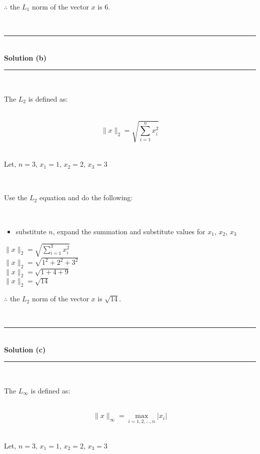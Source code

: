 \documentclass{article}
\begin{document}
\parbox{\textwidth}{$\therefore$ the $L_1$ norm of the vector $x$ is $6$.}\\

\noindent\rule{\textwidth}{0.4pt}\\

\textbf{Solution (b)}

\noindent\rule{\textwidth}{0.4pt}\\

\parbox{\textwidth}{The $L_2$ is defined as:}\\

$$\|x\|_2 = \sqrt{\sum_{i=1}^{n} x_i^2}$$\\

\parbox{\textwidth}{Let, $n=3$, $x_1 = 1$, $x_2 = 2$, $x_3 = 3$}\\

\parbox{\textwidth}{Use the $L_2$ equation and do the following:}\\

\begin{itemize}
    \item {substitute $n$, expand the summation and substitute values for $x_1$, $x_2$, $x_3$}
\end{itemize}

$\|x\|_2 = \sqrt{\sum_{i=1}^{3} x_i^2}$\\

$\|x\|_2 = \sqrt{1^2 + 2^2 + 3^2}$\\

$\|x\|_2 = \sqrt{1 + 4 + 9}$\\

$\|x\|_2 = \sqrt{14}$\\

\parbox{\textwidth}{$\therefore$ the $L_2$ norm of the vector $x$ is $\sqrt{14}$.}\\

\noindent\rule{\textwidth}{0.4pt}\\

\textbf{Solution (c)}

\noindent\rule{\textwidth}{0.4pt}\\

\parbox{\textwidth}{The $L_{\infty}$ is defined as:}\\

$$\|x\|_{\infty} = \max_{i=1,2,...,n} |x_i|$$\\

\parbox{\textwidth}{Let, $n=3$, $x_1 = 1$, $x_2 = 2$, $x_3 = 3$}\\
\end{document}
